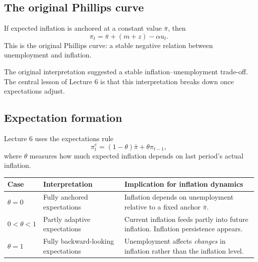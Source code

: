 \documentclass[12pt]{article}
\begin{document}
\subsection{The original Phillips curve}

If expected inflation is anchored at a constant value $\bar{\pi}$, then
\[
\pi_t=\bar{\pi}+(m+z)-\alpha u_t.
\]
This is the original Phillips curve: a stable negative relation between unemployment and inflation.

\begin{center}
\end{center}

The original interpretation suggested a stable inflation--unemployment trade-off. The central lesson of Lecture 6 is that this interpretation breaks down once expectations adjust.

\subsection{Expectation formation}

Lecture 6 uses the expectations rule
\[
\pi_t^e=(1-\theta)\bar{\pi}+\theta \pi_{t-1},
\]
where $\theta$ measures how much expected inflation depends on last period's actual inflation.

\begin{center}
\renewcommand{\arraystretch}{1.2}
\begin{tabularx}{\textwidth}{|p{1.8cm}|X|X|}
\hline
\textbf{Case} & \textbf{Interpretation} & \textbf{Implication for inflation dynamics} \\
\hline
$\theta=0$ & Fully anchored expectations & Inflation depends on unemployment relative to a fixed anchor $\bar{\pi}$. \\
\hline
$0<\theta<1$ & Partly adaptive expectations & Current inflation feeds partly into future inflation. Inflation persistence appears. \\
\hline
$\theta=1$ & Fully backward-looking expectations & Unemployment affects \emph{changes} in inflation rather than the inflation level. \\
\hline
\end{tabularx}
\end{center}
\end{document}
